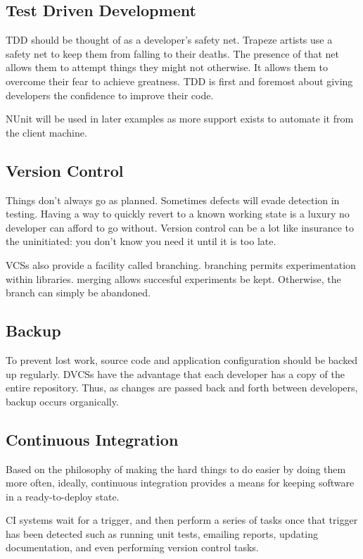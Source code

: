 \subsection{Test Driven Development}

\gls{TDD} should be thought of as a developer's safety net. Trapeze artists use a safety net to keep them from falling to their deaths. The presence
of that net allows them to attempt things they might not otherwise. It allows them to overcome their fear to achieve greatness. \gls{TDD} is first 
and foremost about giving developers the confidence to improve their code.

\gls{NUnit} will be used in later examples as more support exists to automate it from the client machine.

\subsection{Version Control}
Things don't always go as planned. Sometimes defects will evade detection in testing. Having a way to quickly revert to a known working state is a 
luxury no developer can afford to go without. Version control can be a lot like insurance to the uninitiated: you don't know you need it until it is 
too late.

\glspl{VCS} also provide a facility called branching. \Gls{branching} permits experimentation within libraries. \Gls{merging} allows succesful 
experiments be kept. Otherwise, the branch can simply be abandoned. 

\subsection{Backup}
To prevent lost work, source code and application configuration should be backed up regularly. \glspl{DVCS} have the advantage that each developer 
has a copy of the entire repository. Thus, as changes are passed back and forth between developers, backup occurs organically.

\subsection{Continuous Integration}
Based on the philosophy of making the hard things to do easier by doing them more often, ideally, continuous integration provides a means for 
keeping software in a ready-to-deploy state.

\gls{CI} systems wait for a trigger, and then perform a series of tasks once that trigger has been detected such as running unit tests,
emailing reports, updating documentation, and even performing version control tasks.

